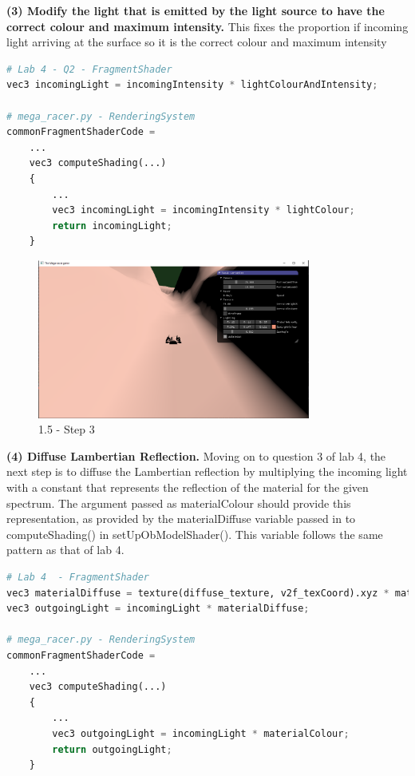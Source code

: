 \documentclass[a4 paper, 12pt]{article}
\begin{document}
\textbf{(3) Modify the light that is emitted by the light source to have the correct colour and maximum intensity.}
This fixes the proportion if incoming light arriving at the surface so it is the correct colour and maximum intensity
    \begin{lstlisting}[language=python] 
# Lab 4 - Q2 - FragmentShader
vec3 incomingLight = incomingIntensity * lightColourAndIntensity;

# mega_racer.py - RenderingSystem
commonFragmentShaderCode =
    ...
    vec3 computeShading(...)
    {
        ...
        vec3 incomingLight = incomingIntensity * lightColour;
        return incomingLight;
    }        
    \end{lstlisting}

    \begin{figure} [H]
        \centering
        \includegraphics[width=0.8\textwidth, frame]
            {./images/mega_racer/1.5_c.PNG}
        \caption{1.5 - Step 3}
    \end{figure}


\textbf{(4) Diffuse Lambertian Reflection.}
Moving on to question 3 of lab 4, the next step is to diffuse the Lambertian reflection by multiplying the incoming light with a constant that represents the reflection of the material for the given spectrum. The argument passed as materialColour should provide this representation, as provided by the materialDiffuse variable passed in to computeShading() in setUpObModelShader(). This variable follows the same pattern as that of lab 4.  
    \begin{lstlisting}[language=python] 
# Lab 4  - FragmentShader
vec3 materialDiffuse = texture(diffuse_texture, v2f_texCoord).xyz * material_diffuse_color;
vec3 outgoingLight = incomingLight * materialDiffuse;

# mega_racer.py - RenderingSystem
commonFragmentShaderCode =
    ...
    vec3 computeShading(...)
    {
        ...
        vec3 outgoingLight = incomingLight * materialColour;
        return outgoingLight;
    }                            
    \end{lstlisting}
\end{document}
